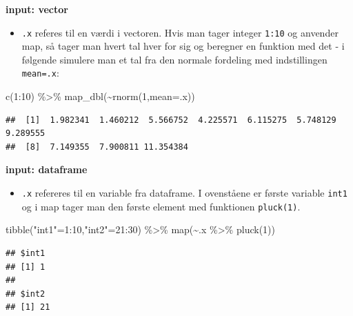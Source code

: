 \documentclass[
]{book}
\newenvironment{Shaded}{\begin{snugshade}}{\end{snugshade}}
\newcommand{\AttributeTok}[1]{\textcolor[rgb]{0.77,0.63,0.00}{#1}}
\newcommand{\DecValTok}[1]{\textcolor[rgb]{0.00,0.00,0.81}{#1}}
\newcommand{\FunctionTok}[1]{\textcolor[rgb]{0.00,0.00,0.00}{#1}}
\newcommand{\NormalTok}[1]{#1}
\newcommand{\OtherTok}[1]{\textcolor[rgb]{0.56,0.35,0.01}{#1}}
\newcommand{\SpecialCharTok}[1]{\textcolor[rgb]{0.00,0.00,0.00}{#1}}
\newcommand{\StringTok}[1]{\textcolor[rgb]{0.31,0.60,0.02}{#1}}
\providecommand{\tightlist}{%
  \setlength{\itemsep}{0pt}\setlength{\parskip}{0pt}}
\begin{document}
\textbf{input: vector}

\begin{itemize}
\tightlist
\item
  \texttt{.x} referes til en værdi i vectoren. Hvis man tager integer \texttt{1:10} og anvender map, så tager man hvert tal hver for sig og beregner en funktion med det - i følgende simulere man et tal fra den normale fordeling med indstillingen \texttt{mean=.x}:
\end{itemize}

\begin{Shaded}
\begin{Highlighting}[]
\FunctionTok{c}\NormalTok{(}\DecValTok{1}\SpecialCharTok{:}\DecValTok{10}\NormalTok{) }\SpecialCharTok{\%\textgreater{}\%} \FunctionTok{map\_dbl}\NormalTok{(}\SpecialCharTok{\textasciitilde{}}\FunctionTok{rnorm}\NormalTok{(}\DecValTok{1}\NormalTok{,}\AttributeTok{mean=}\NormalTok{.x))}
\end{Highlighting}
\end{Shaded}

\begin{verbatim}
##  [1]  1.982341  1.460212  5.566752  4.225571  6.115275  5.748129  9.289555
##  [8]  7.149355  7.900811 11.354384
\end{verbatim}

\textbf{input: dataframe}

\begin{itemize}
\tightlist
\item
  \texttt{.x} refereres til en variable fra dataframe. I ovenståene er første variable \texttt{int1} og i map tager man den første element med funktionen \texttt{pluck(1)}.
\end{itemize}

\begin{Shaded}
\begin{Highlighting}[]
\FunctionTok{tibble}\NormalTok{(}\StringTok{"int1"}\OtherTok{=}\DecValTok{1}\SpecialCharTok{:}\DecValTok{10}\NormalTok{,}\StringTok{"int2"}\OtherTok{=}\DecValTok{21}\SpecialCharTok{:}\DecValTok{30}\NormalTok{) }\SpecialCharTok{\%\textgreater{}\%} \FunctionTok{map}\NormalTok{(}\SpecialCharTok{\textasciitilde{}}\NormalTok{.x }\SpecialCharTok{\%\textgreater{}\%} \FunctionTok{pluck}\NormalTok{(}\DecValTok{1}\NormalTok{))}
\end{Highlighting}
\end{Shaded}

\begin{verbatim}
## $int1
## [1] 1
## 
## $int2
## [1] 21
\end{verbatim}
\end{document}
